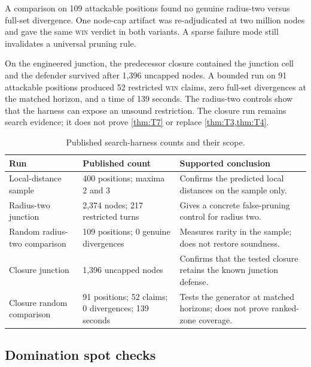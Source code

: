A comparison on 109 attackable positions found no genuine radius-two versus
full-set divergence.  One node-cap artifact was re-adjudicated at two million
nodes and gave the same \textsc{win} verdict in both variants.  A sparse
failure mode still invalidates a universal pruning rule.

On the engineered junction, the predecessor closure contained the junction
cell and the defender survived after 1,396 uncapped nodes.  A bounded run on
91 attackable positions produced 52 restricted \textsc{win} claims, zero
full-set divergences at the matched horizon, and a time of 139 seconds.  The
radius-two controls show that the harness can expose an unsound restriction.
The closure run remains search evidence; it does not prove \cref{thm:T7} or
replace \cref{thm:T3,thm:T4}.

\begin{table}[tbp]
  \centering
  \caption{Published search-harness counts and their scope.}
  \label{tab:search-validation}
  \small
  \renewcommand{\arraystretch}{1.08}
  \begin{tabular}{@{}p{}p{}p{}@{}}
    \toprule
    Run & Published count & Supported conclusion \\
    \midrule
    Local-distance sample & 400 positions; maxima 2 and 3 &
      Confirms the predicted local distances on the sample only. \\
    Radius-two junction & 2,374 nodes; 217 restricted turns &
      Gives a concrete false-pruning control for radius two. \\
    Random radius-two comparison & 109 positions; 0 genuine divergences &
      Measures rarity in the sample; does not restore soundness. \\
    Closure junction & 1,396 uncapped nodes &
      Confirms that the tested closure retains the known junction defense. \\
    Closure random comparison & 91 positions; 52 claims; 0 divergences;
      139 seconds &
      Tests the generator at matched horizons; does not prove ranked-zone
      coverage. \\
    \bottomrule
  \end{tabular}
\end{table}

\subsection{Domination spot checks}

